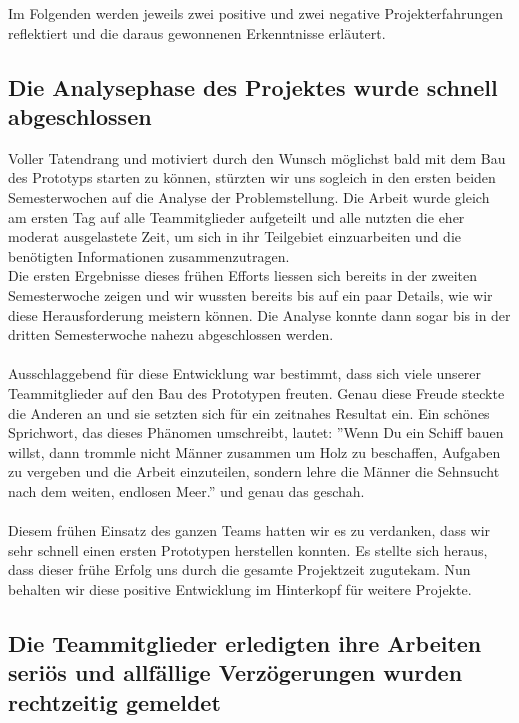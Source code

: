 Im  Folgenden werden jeweils zwei positive und zwei negative Projekterfahrungen reflektiert und die daraus gewonnenen Erkenntnisse erläutert.

\subsection{Die Analysephase des Projektes wurde schnell abgeschlossen}

Voller Tatendrang und motiviert durch den Wunsch möglichst bald mit dem Bau des Prototyps starten zu können, stürzten wir uns sogleich in den ersten beiden Semesterwochen auf die Analyse der Problemstellung. Die Arbeit wurde gleich am ersten Tag auf alle Teammitglieder aufgeteilt und alle nutzten die eher moderat ausgelastete Zeit, um sich in ihr Teilgebiet einzuarbeiten und die benötigten Informationen zusammenzutragen.\\
Die ersten Ergebnisse dieses frühen Efforts liessen sich bereits in der zweiten Semesterwoche zeigen und wir wussten bereits bis auf ein paar Details, wie wir diese Herausforderung meistern können. Die Analyse konnte dann sogar bis in der dritten Semesterwoche nahezu abgeschlossen werden.\\
\\
Ausschlaggebend für diese Entwicklung war bestimmt, dass sich viele unserer Teammitglieder auf den Bau des Prototypen freuten. Genau diese Freude steckte die Anderen an und sie setzten sich für ein zeitnahes Resultat ein. Ein schönes Sprichwort, das dieses Phänomen umschreibt, lautet:  ''Wenn Du ein Schiff bauen willst, dann trommle nicht Männer zusammen um Holz zu beschaffen, Aufgaben zu vergeben und die Arbeit einzuteilen, sondern lehre die Männer die Sehnsucht nach dem weiten, endlosen Meer.'' \cite{SCHIFF} und genau das geschah.\\
\\
Diesem frühen Einsatz des ganzen Teams hatten wir es zu verdanken, dass wir sehr schnell einen ersten Prototypen herstellen konnten. Es stellte sich heraus, dass dieser frühe Erfolg uns durch die gesamte Projektzeit zugutekam. Nun behalten wir diese positive Entwicklung im Hinterkopf für weitere Projekte.

\subsection{Die Teammitglieder erledigten ihre Arbeiten seriös und allfällige Verzögerungen wurden rechtzeitig gemeldet}

